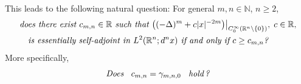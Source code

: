\documentclass[reqno,11pt,centertags]{amsart}
\newcommand{\bbN}{{\mathbb{N}}}
\newcommand{\bbR}{{\mathbb{R}}}
\newcommand{\<}{\langle}
\renewcommand{\>}{\rangle}
\newcommand{\lb}{\label}
\numberwithin{equation}{section}
\theoremstyle{definition}
\begin{document}
 





\bigskip
This leads to the following natural question: For general $m,n\in \bbN$, $n\geq 2$, 
\begin{align}
\begin{split} 
& \text{\it does there exist $c_{m,n} \in \bbR$ such that } 
 \big((-\Delta)^m +c|x|^{-2m}\big)\big|_{C_0^{\infty}(\bbR^n \backslash \{0\})},  \; c \in \bbR, \\
& \quad \text{\it is essentially self-adjoint in $L^2(\bbR^n;d^nx)$ if and only if $c \geq c_{m,n}$?}
\end{split} \lb{guess}
\end{align}
More specifically, 
\begin{equation}
\text{\it Does \, $c_{m,n} = \gamma_{m,n,0}$ \, hold\,?}    \lb{guess2}
\end{equation}
\end{document}
